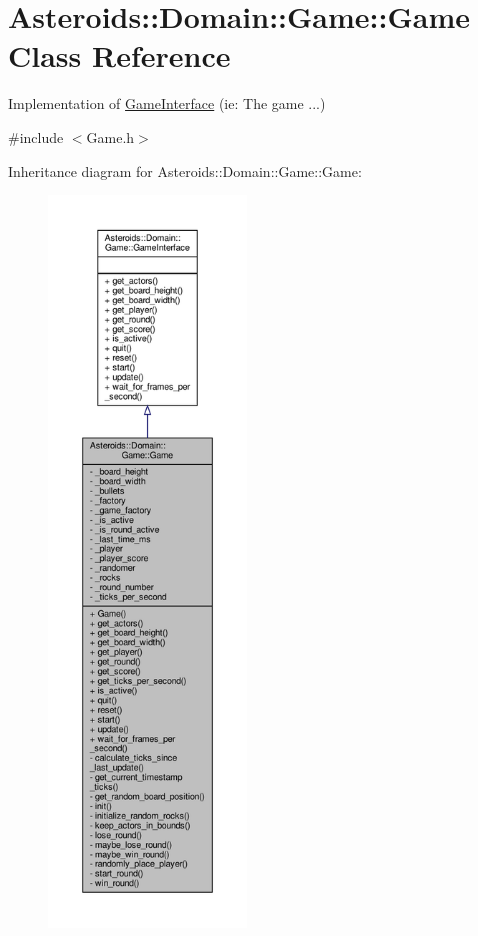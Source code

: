 \hypertarget{classAsteroids_1_1Domain_1_1Game_1_1Game}{}\section{Asteroids\+:\+:Domain\+:\+:Game\+:\+:Game Class Reference}
\label{classAsteroids_1_1Domain_1_1Game_1_1Game}


Implementation of \hyperlink{classAsteroids_1_1Domain_1_1Game_1_1GameInterface}{Game\+Interface} (ie\+: The game ...)  




{\ttfamily \#include $<$Game.\+h$>$}



Inheritance diagram for Asteroids\+:\+:Domain\+:\+:Game\+:\+:Game\+:\nopagebreak
\begin{figure}[H]
\begin{center}
\leavevmode
\includegraphics[height=550pt]{classAsteroids_1_1Domain_1_1Game_1_1Game__inherit__graph}
\end{center}
\end{figure}


